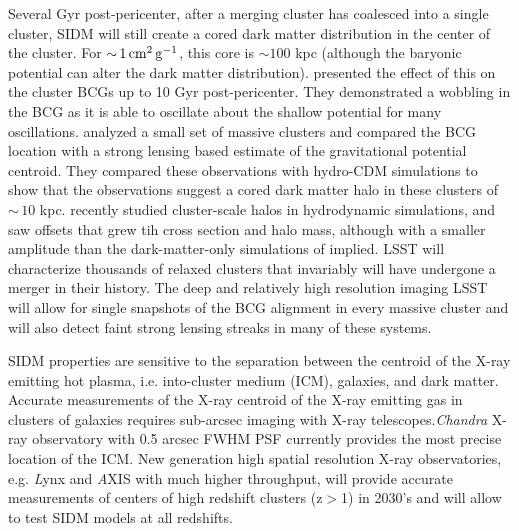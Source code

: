 Several Gyr post-pericenter, after a merging cluster has coalesced into a single cluster, SIDM will still create a cored dark matter distribution in the center of the cluster. For $ {\sim}\, 1 \mathrm{\,cm}^{2} \mathrm{\,g}^{-1}$, this core is $\sim 100$ kpc (although the baryonic potential can alter the dark matter distribution). \citet{1608.08630} presented the effect of this on the cluster BCGs up to 10 Gyr post-pericenter. They demonstrated a wobbling in the BCG as it is able to oscillate about the shallow potential for many oscillations. \citet{1703.07365} analyzed a small set of massive clusters and compared the BCG location with a strong lensing based estimate of the gravitational potential centroid. They compared these observations with hydro-CDM simulations to show that the observations suggest a cored dark matter halo in these clusters of $\sim\,10$ kpc. \citet{Harvey:2018uwf} recently studied cluster-scale halos in hydrodynamic simulations, and saw offsets that grew tih cross section and halo mass, although with a smaller amplitude than the dark-matter-only simulations of \citet{1608.08630} implied. LSST will characterize thousands of relaxed clusters that invariably will have undergone a merger in their history. The deep and relatively high resolution imaging LSST will allow for single snapshots of the BCG alignment in every massive cluster and will also detect faint strong lensing streaks in many of these systems.

SIDM properties are sensitive to the separation between the  centroid of the X-ray emitting hot plasma, i.e. into-cluster medium (ICM), galaxies, and dark matter. Accurate measurements of the X-ray centroid of the X-ray emitting gas in clusters of galaxies requires sub-arcsec imaging with X-ray telescopes.{\it Chandra} X-ray observatory with 0.5 arcsec FWHM PSF currently provides the most precise location of the ICM. New generation high spatial resolution X-ray observatories, e.g. {\textit Lynx} and {\textit AXIS} with much higher throughput, will provide accurate measurements of centers of high redshift clusters (z$>$1) in 2030’s and will allow to test SIDM models at all redshifts.


